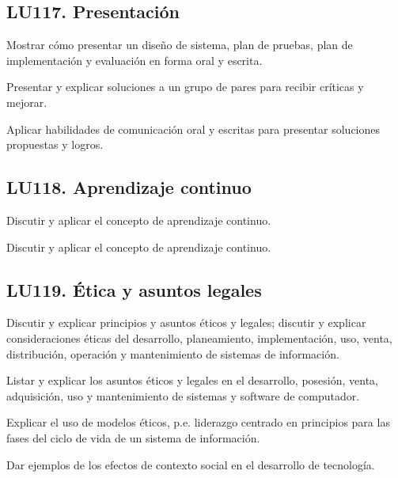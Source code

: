 \subsection{LU117. Presentación}\label{sec:LU117}
\begin{LearningUnit}
\begin{LUGoal}
\item Mostrar cómo presentar un diseño de sistema, plan de pruebas, plan de implementación y evaluación en forma oral y escrita.
\end{LUGoal}

\begin{LUObjective}
\item Presentar y explicar soluciones a un grupo de pares para recibir críticas y mejorar.
\item Aplicar habilidades de comunicación oral y escritas para presentar soluciones propuestas y logros.
\end{LUObjective}
\end{LearningUnit}

\subsection{LU118. Aprendizaje continuo}\label{sec:LU118}
\begin{LearningUnit}
\begin{LUGoal}
\item Discutir y aplicar el concepto de aprendizaje continuo.
\end{LUGoal}

\begin{LUObjective}
\item Discutir y aplicar el concepto de aprendizaje continuo.
\end{LUObjective}
\end{LearningUnit}

\subsection{LU119. Ética y asuntos legales}\label{sec:LU119}
\begin{LearningUnit}
\begin{LUGoal}
\item Discutir y explicar principios y asuntos éticos y legales; discutir y explicar consideraciones éticas del desarrollo, planeamiento, implementación, uso, venta, distribución, operación y mantenimiento de sistemas de información.
\end{LUGoal}

\begin{LUObjective}
\item Listar y explicar los asuntos éticos y legales en el desarrollo, posesión, venta, adquisición, uso y mantenimiento de sistemas y software de computador.
\item Explicar el uso de modelos éticos, p.e. liderazgo centrado en principios para las fases del ciclo de vida de un sistema de información.
\item Dar ejemplos de los efectos de contexto social en el desarrollo de tecnología.
\end{LUObjective}
\end{LearningUnit}

